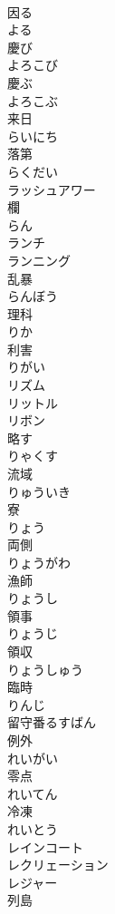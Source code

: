 \documentclass[8pt]{extreport}
\begin{document}
\begin{CJK}{UTF8}{min}
\\	因る 
\\	よる	
\\	慶び 
\\	よろこび	
\\	慶ぶ 
\\	よろこぶ	
\\	来日 
\\	らいにち	
\\	落第 
\\	らくだい	
\\	ラッシュアワー	
\\	欄 
\\	らん	
\\	ランチ	
\\	ランニング	
\\	乱暴 
\\	らんぼう	
\\	理科 
\\	りか	
\\	利害 
\\	りがい	
\\	リズム	
\\	リットル	
\\	リボン	
\\	略す 
\\	りゃくす	
\\	流域 
\\	りゅういき	
\\	寮 
\\	りょう	
\\	両側 
\\	りょうがわ	
\\	漁師 
\\	りょうし	
\\	領事 
\\	りょうじ	
\\	領収 
\\	りょうしゅう	
\\	臨時 
\\	りんじ	
\\	留守番るすばん	
\\	例外 
\\	れいがい	
\\	零点 
\\	れいてん	
\\	冷凍 
\\	れいとう	
\\	レインコート	
\\	レクリェーション	
\\	レジャー	
\\	列島 

\end{CJK}
\end{document}
